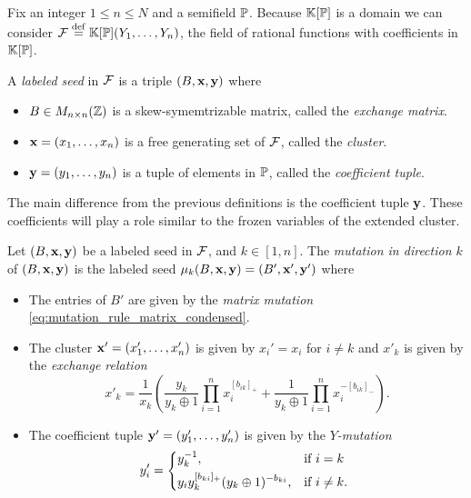 Fix an integer $1 \leq n \leq N$ and a semifield $\mathbb{P}$. Because $\mathbb{K}[\mathbb{P}]$ is a
domain we can consider $\mathcal{F} \overset{\mathrm{def}}{=} \mathbb{K}[\mathbb{P}](Y_1, \dots, Y_n)$, the field of rational
functions with coefficients in $\mathbb{K}[\mathbb{P}]$.
\begin{definition}

	A \emph{labeled seed} in $\mathcal{F}$ is a triple $(B, \mathbf{x}, \mathbf{y})$ where
	\begin{itemize}
		\item $B \in M_{n \times n}(\mathbb{Z})$ is a skew-symemtrizable matrix, called the \emph{exchange matrix}.
		\item $\mathbf{x} = (x_1, \dots, x_n)$ is a free generating set of $\mathcal{F}$, called the \emph{cluster}.
		\item $\mathbf{y} = (y_1, \dots, y_n)$ is a tuple of elements in $\mathbb{P}$, called the \emph{coefficient tuple}.
	\end{itemize}
\end{definition}
%
The main difference from the previous definitions is the coefficient tuple $\mathbf{y}$. These
coefficients will play a role similar to the frozen variables of the extended cluster.

\begin{definition}
	Let $(B, \mathbf{x}, \mathbf{y})$ be a labeled seed in $\mathcal{F}$, and $k \in [1, n]$. The \emph{mutation in direction $k$} of $(B, \mathbf{x}, \mathbf{y})$ is the labeled seed $\mu_k(B, \mathbf{x}, \mathbf{y}) = (B', \mathbf{x}', \mathbf{y}')$ where
	\begin{itemize}
		\item The entries of $B'$ are given by the \emph{matrix mutation}
		      \cref{eq:mutation_rule_matrix_condensed}.
		\item The cluster $\mathbf{x}' = (x_1', \dots, x_n')$ is given by $x_i' = x_i$ for $i \neq k$ and
		      $x'_k$ is given by the \emph{exchange relation}
		      \begin{equation}\label{eq:exchange_relation_coefficients}
			      x'_k = \frac{1}{x_k}\left(\frac{y_k}{y_k \oplus 1} \prod_{i=1}^n x_i^{[b_{ik}]_{+}} + \frac{1}{y_k \oplus 1}\prod_{i=1}^n x_i^{-[b_{ik}]_{-}}\right).
		      \end{equation}
		\item The coefficient tuple $\mathbf{y}' = (y'_1, \dots, y'_n)$ is given by the
		      \emph{$Y$-mutation}
		      \begin{equation}\label{eq:Y_mutation}
			      y'_i = \begin{dcases*}
				      y_k\inv,                                        & if $i = k$     \\
				      y_i y_k^{[b_{ki}]_{+}}(y_k \oplus 1)^{-b_{ki}}, & if $i \neq k$.
			      \end{dcases*}
		      \end{equation}
	\end{itemize}
\end{definition}

